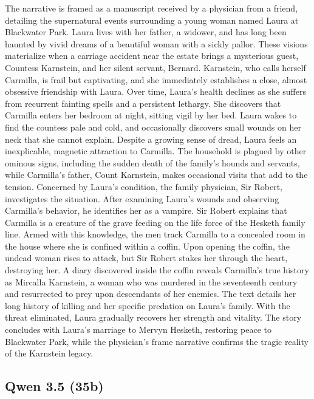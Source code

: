 \documentclass{article} %
\begin{document}
\textcolor{skipred}{The narrative is framed as a manuscript received by a physician from a friend, detailing the supernatural events surrounding a young woman named Laura at Blackwater Park.} Laura lives with her father, a widower, and has long been haunted by vivid dreams of a beautiful woman with a sickly pallor. These visions materialize when a carriage accident near the estate brings a mysterious guest, Countess Karnstein, and her silent servant, Bernard. Karnstein, who calls herself Carmilla, is frail but captivating, and she immediately establishes a close, almost obsessive friendship with Laura. Over time, Laura's health declines as she suffers from recurrent fainting spells and a persistent lethargy. She discovers that Carmilla enters her bedroom at night, sitting vigil by her bed. \textcolor{skipred}{Laura wakes to find the countess pale and cold, and occasionally discovers small wounds on her neck that she cannot explain.} Despite a growing sense of dread, Laura feels an inexplicable, magnetic attraction to Carmilla. The household is plagued by other ominous signs, including the sudden death of the family's hounds and servants, while Carmilla's father, Count Karnstein, makes occasional visits that add to the tension. Concerned by Laura's condition, the family physician, Sir Robert, investigates the situation. After examining Laura's wounds and observing Carmilla's behavior, he identifies her as a vampire. \textcolor{skipred}{Sir Robert explains that Carmilla is a creature of the grave feeding on the life force of the Hesketh family line.} Armed with this knowledge, the men track Carmilla to a concealed room in the house where she is confined within a coffin. Upon opening the coffin, the undead woman rises to attack, but Sir Robert stakes her through the heart, destroying her. \textcolor{skipred}{A diary discovered inside the coffin reveals Carmilla's true history as Mircalla Karnstein, a woman who was murdered in the seventeenth century and resurrected to prey upon descendants of her enemies. The text details her long history of killing and her specific predation on Laura's family. With the threat eliminated, Laura gradually recovers her strength and vitality. The story concludes with Laura's marriage to Mervyn Hesketh, restoring peace to Blackwater Park, while the physician's frame narrative confirms the tragic reality of the Karnstein legacy.}


\subsection{Qwen 3.5 (35b)}
\end{document}
